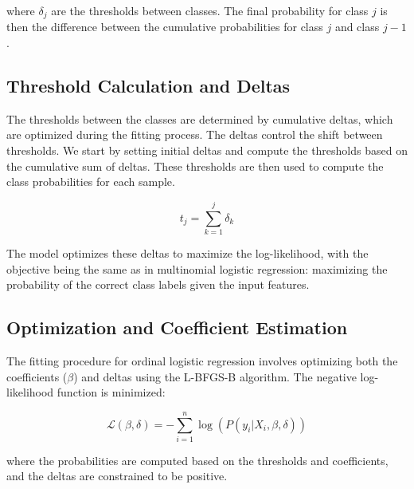 \documentclass[fleqn,moreauthors,10pt]{ds_report}
\begin{document}
where \(\delta_j\) are the thresholds between classes. The final probability for class \(j\) is then the difference between the cumulative probabilities for class \(j\) and class \(j-1\).

\subsection{Threshold Calculation and Deltas}
The thresholds between the classes are determined by cumulative deltas, which are optimized during the fitting process. The deltas control the shift between thresholds. We start by setting initial deltas and compute the thresholds based on the cumulative sum of deltas. These thresholds are then used to compute the class probabilities for each sample.

\[
t_j = \sum_{k=1}^{j} \delta_k
\]

The model optimizes these deltas to maximize the log-likelihood, with the objective being the same as in multinomial logistic regression: maximizing the probability of the correct class labels given the input features.

\subsection{Optimization and Coefficient Estimation}
The fitting procedure for ordinal logistic regression involves optimizing both the coefficients (\(\beta\)) and deltas using the L-BFGS-B algorithm. The negative log-likelihood function is minimized:

\[
\mathcal{L}(\beta, \delta) = -\sum_{i=1}^{n} \log(P(y_i | X_i, \beta, \delta))
\]

where the probabilities are computed based on the thresholds and coefficients, and the deltas are constrained to be positive.







%
%
\end{document}
